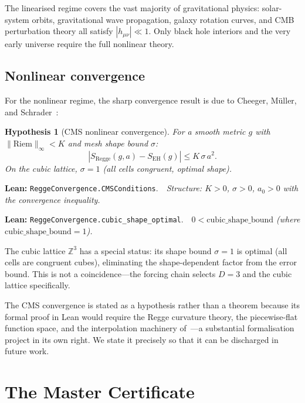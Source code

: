 \documentclass[11pt,a4paper]{article}
\newtheorem{hypothesis}[theorem]{Hypothesis}
\newcommand{\ZZ}{\mathbb{Z}}
\newcommand{\lean}[1]{\texttt{#1}}
\newcommand{\leanref}[2]{\noindent\textbf{Lean:} \lean{#1}.\ \ \textit{#2}}
\begin{document}
\noindent The linearised regime covers the vast majority of gravitational physics: solar-system orbits, gravitational wave propagation, galaxy rotation curves, and CMB perturbation theory all satisfy $|h_{\mu\nu}| \ll 1$.
Only black hole interiors and the very early universe require the full nonlinear theory.

\subsection{Nonlinear convergence}

For the nonlinear regime, the sharp convergence result is due to Cheeger, M\"uller, and Schrader~\cite{CheegerMullerSchrader1984}:

\begin{hypothesis}[CMS nonlinear convergence]
\label{hyp:cms}
For a smooth metric $g$ with $\|\mathrm{Riem}\|_\infty < K$ and mesh shape bound $\sigma$:
\begin{equation}\label{eq:cms}
|S_{\mathrm{Regge}}(g,a) - S_{\mathrm{EH}}(g)| \le K\,\sigma\,a^2.
\end{equation}
On the cubic lattice, $\sigma = 1$ (all cells congruent, optimal shape).
\end{hypothesis}

\leanref{ReggeConvergence.CMSConditions}{Structure: $K > 0$, $\sigma > 0$, $a_0 > 0$ with the convergence inequality.}

\leanref{ReggeConvergence.cubic\_shape\_optimal}{$0 < \mathrm{cubic\_shape\_bound}$ (where $\mathrm{cubic\_shape\_bound} = 1$).}

\noindent The cubic lattice $\ZZ^3$ has a special status: its shape bound $\sigma = 1$ is optimal (all cells are congruent cubes), eliminating the shape-dependent factor from the error bound.
This is not a coincidence---the forcing chain selects $D = 3$ and the cubic lattice specifically.

The CMS convergence is stated as a hypothesis rather than a theorem because its formal proof in Lean would require the Regge curvature theory, the piecewise-flat function space, and the interpolation machinery of~\cite{Christiansen2011}---a substantial formalisation project in its own right.
We state it precisely so that it can be discharged in future work.

\section{The Master Certificate}
\label{sec:cert}
\end{document}
